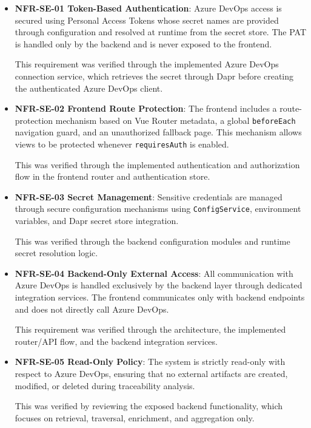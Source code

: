 \begin{itemize}

\item \textbf{NFR-SE-01  Token-Based Authentication}:  
Azure DevOps access is secured using Personal Access Tokens whose secret names are provided through configuration and resolved at runtime from the secret store. The PAT is handled only by the backend and is never exposed to the frontend.

This requirement was verified through the implemented Azure DevOps connection service, which retrieves the secret through Dapr before creating the authenticated Azure DevOps client.

\item \textbf{NFR-SE-02  Frontend Route Protection}:  
The frontend includes a route-protection mechanism based on Vue Router metadata, a global \texttt{beforeEach} navigation guard, and an unauthorized fallback page. This mechanism allows views to be protected whenever \texttt{requiresAuth} is enabled.

This was verified through the implemented authentication and authorization flow in the frontend router and authentication store.

\item \textbf{NFR-SE-03  Secret Management}:  
Sensitive credentials are managed through secure configuration mechanisms using \texttt{ConfigService}, environment variables, and Dapr secret store integration.

This was verified through the backend configuration modules and runtime secret resolution logic.

\item \textbf{NFR-SE-04  Backend-Only External Access}:  
All communication with Azure DevOps is handled exclusively by the backend layer through dedicated integration services. The frontend communicates only with backend endpoints and does not directly call Azure DevOps.

This requirement was verified through the architecture, the implemented router/API flow, and the backend integration services.

\item \textbf{NFR-SE-05  Read-Only Policy}:  
The system is strictly read-only with respect to Azure DevOps, ensuring that no external artifacts are created, modified, or deleted during traceability analysis.

This was verified by reviewing the exposed backend functionality, which focuses on retrieval, traversal, enrichment, and aggregation only.

\end{itemize}
